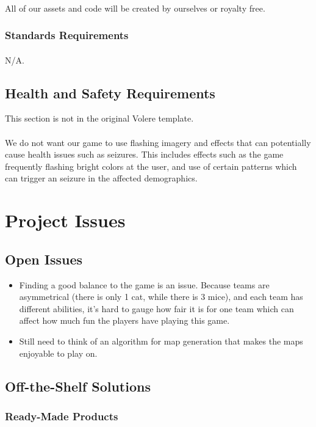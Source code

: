 \documentclass[12pt, titlepage]{article}
\begin{document}
\paragraph{}All of our assets and code will be created by ourselves or royalty free.
\subsubsection{Standards Requirements}
\paragraph{}N/A.
\subsection{Health and Safety Requirements}
This section is not in the original Volere template.
\paragraph{}We do not want our game to use flashing imagery and effects that can potentially cause health issues such as seizures. This includes effects such as the game frequently flashing bright colors at the user, and use of certain patterns which can trigger an seizure in the affected demographics.
\section{Project Issues}
\subsection{Open Issues}
\begin{itemize}
    \item Finding a good balance to the game is an issue. Because teams are asymmetrical (there is only 1 cat, while there is 3 mice), and each team has different abilities, it's hard to gauge how fair it is for one team which can affect how much fun the players have playing this game. 
    \item Still need to think of an algorithm for map generation that makes the maps enjoyable to play on. 
\end{itemize}
\subsection{Off-the-Shelf Solutions}
\subsubsection{Ready-Made Products}
\end{document}
